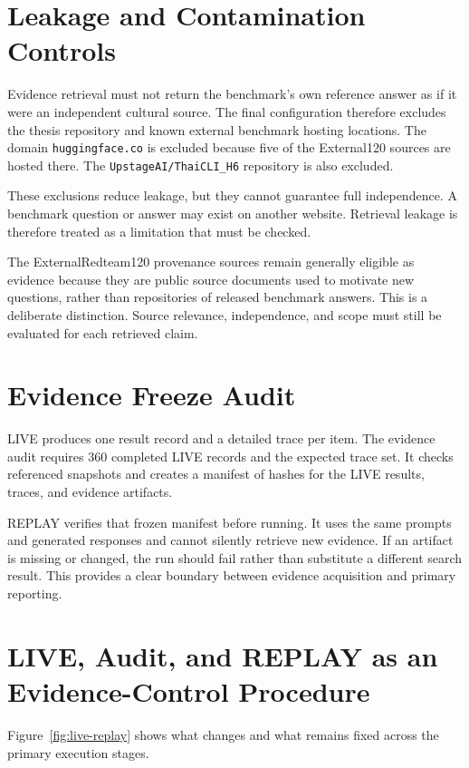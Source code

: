 \section{Leakage and Contamination Controls}

Evidence retrieval must not return the benchmark's own reference answer as if it were an independent cultural source. The final configuration therefore excludes the thesis repository and known external benchmark hosting locations. The domain \texttt{huggingface.co} is excluded because five of the External120 sources are hosted there. The \texttt{UpstageAI/ThaiCLI\_H6} repository is also excluded.

These exclusions reduce leakage, but they cannot guarantee full independence. A benchmark question or answer may exist on another website. Retrieval leakage is therefore treated as a limitation that must be checked.

The ExternalRedteam120 provenance sources remain generally eligible as evidence because they are public source documents used to motivate new questions, rather than repositories of released benchmark answers. This is a deliberate distinction. Source relevance, independence, and scope must still be evaluated for each retrieved claim.

\section{Evidence Freeze Audit}

LIVE produces one result record and a detailed trace per item. The evidence audit requires 360 completed LIVE records and the expected trace set. It checks referenced snapshots and creates a manifest of hashes for the LIVE results, traces, and evidence artifacts.

REPLAY verifies that frozen manifest before running. It uses the same prompts and generated responses and cannot silently retrieve new evidence. If an artifact is missing or changed, the run should fail rather than substitute a different search result. This provides a clear boundary between evidence acquisition and primary reporting.

\section{LIVE, Audit, and REPLAY as an Evidence-Control Procedure}

Figure~\ref{fig:live-replay} shows what changes and what remains fixed across the primary execution stages.

